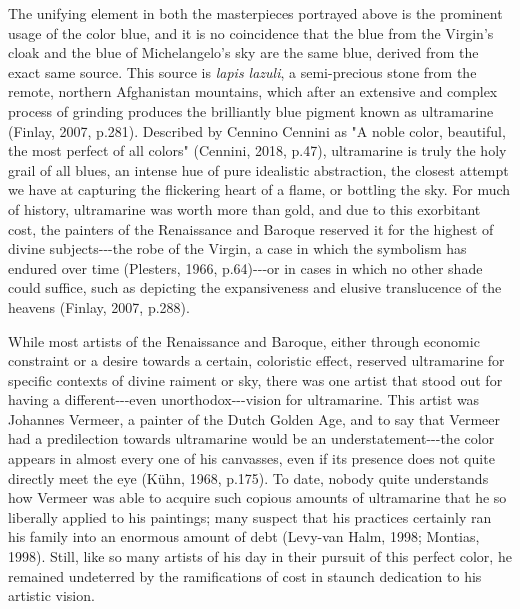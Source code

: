 The unifying element in both the masterpieces portrayed above is the
prominent usage of the color blue, and it is no coincidence that the
blue from the Virgin's cloak and the blue of Michelangelo's sky are the
same blue, derived from the exact same source. This source is
\emph{lapis lazuli}, a semi-precious stone from the remote, northern
Afghanistan mountains, which after an extensive and complex process of
grinding produces the brilliantly blue pigment known as ultramarine
(Finlay, 2007, p.281). Described by Cennino Cennini as "A noble color,
beautiful, the most perfect of all colors" (Cennini, 2018, p.47),
ultramarine is truly the holy grail of all blues, an intense hue of pure
idealistic abstraction, the closest attempt we have at capturing the
flickering heart of a flame, or bottling the sky. For much of history,
ultramarine was worth more than gold, and due to this exorbitant cost,
the painters of the Renaissance and Baroque reserved it for the highest
of divine subjects-\/-\/-the robe of the Virgin, a case in which the
symbolism has endured over time (Plesters, 1966, p.64)-\/-\/-or in cases
in which no other shade could suffice, such as depicting the
expansiveness and elusive translucence of the heavens (Finlay, 2007,
p.288).

While most artists of the Renaissance and Baroque, either through
economic constraint or a desire towards a certain, coloristic effect,
reserved ultramarine for specific contexts of divine raiment or sky,
there was one artist that stood out for having a different-\/-\/-even
unorthodox-\/-\/-vision for ultramarine. This artist was Johannes
Vermeer, a painter of the Dutch Golden Age, and to say that Vermeer had
a predilection towards ultramarine would be an understatement-\/-\/-the
color appears in almost every one of his canvasses, even if its presence
does not quite directly meet the eye (Kühn, 1968, p.175). To date,
nobody quite understands how Vermeer was able to acquire such copious
amounts of ultramarine that he so liberally applied to his paintings;
many suspect that his practices certainly ran his family into an
enormous amount of debt (Levy-van Halm, 1998; Montias, 1998). Still,
like so many artists of his day in their pursuit of this perfect color,
he remained undeterred by the ramifications of cost in staunch
dedication to his artistic vision.

